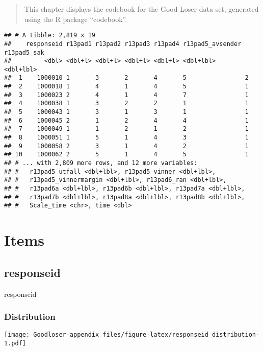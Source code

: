 \documentclass[]{book}
\begin{document}
\begin{quote}
This chapter displays the codebook for the Good Loser data set,
generated using the R package ``codebook''.
\end{quote}

\begin{verbatim}
## # A tibble: 2,819 x 19
##    responseid r13pad1 r13pad2 r13pad3 r13pad4 r13pad5_avsender r13pad5_sak
##         <dbl> <dbl+l> <dbl+l> <dbl+l> <dbl+l> <dbl+lbl>        <dbl+lbl>  
##  1    1000010 1       3       2       4       5                2          
##  2    1000018 1       4       1       4       5                1          
##  3    1000023 2       4       1       4       7                1          
##  4    1000038 1       3       2       2       1                1          
##  5    1000043 1       3       1       3       1                1          
##  6    1000045 2       1       2       4       4                1          
##  7    1000049 1       1       2       1       2                1          
##  8    1000051 1       5       1       4       3                1          
##  9    1000058 2       3       1       4       2                1          
## 10    1000062 2       5       1       4       5                1          
## # ... with 2,809 more rows, and 12 more variables:
## #   r13pad5_utfall <dbl+lbl>, r13pad5_vinner <dbl+lbl>,
## #   r13pad5_vinnermargin <dbl+lbl>, r13pad6_ran <dbl+lbl>,
## #   r13pad6a <dbl+lbl>, r13pad6b <dbl+lbl>, r13pad7a <dbl+lbl>,
## #   r13pad7b <dbl+lbl>, r13pad8a <dbl+lbl>, r13pad8b <dbl+lbl>,
## #   Scale_time <chr>, time <dbl>
\end{verbatim}

\section{Items}\label{items-2}

\subsection{responseid}\label{responseid}

responseid

\subsubsection{Distribution}\label{responseid_distribution}

\texttt{[image: Goodloser-appendix\_files/figure-latex/responseid\_distribution-1.pdf]}
\end{document}
